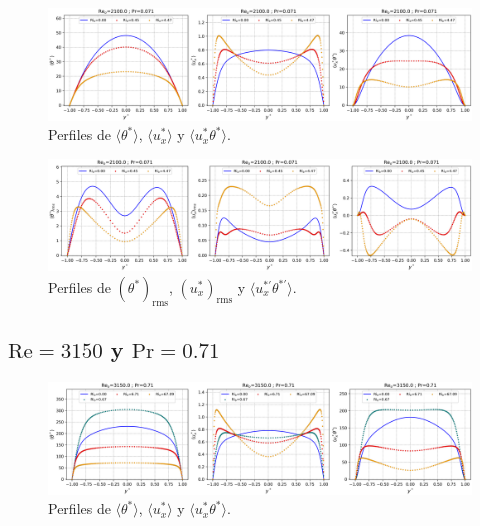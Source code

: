 \begin{figure}[H]
  \centering
    \includegraphics[width=\textwidth]{figures/apendices/developed/Re2100-Pr0071_merged_phi-ux-uxphi.png}
  \caption{Perfiles de  $\langle \theta^* \rangle$,  $\langle u^*_x \rangle$ y   $\langle u^*_x \theta^* \rangle$.}
  \label{fig:profs-Re2100-Pr0071}
\end{figure}

\begin{figure}[H]
  \centering
    \includegraphics[width=\textwidth]{figures/apendices/developed/Re2100-Pr0071_merged_phif-uxf-uxphif.png}
  \caption{Perfiles de  $( \theta^*)_{\text{rms}}$,  $(u^*_x)_{\text{rms}}$ y   $\langle u^{* \prime}_x \theta^{* \prime} \rangle$.}
  \label{fig:profs-Re2100-Pr0071}
\end{figure}


\subsection*{$\text{Re}=3150$ y $\text{Pr}=0\text{.}71$}

\begin{figure}[H]
  \centering
    \includegraphics[width=\textwidth]{figures/apendices/developed/Re3150-Pr071_merged_phi-ux-uxphi.png}
  \caption{Perfiles de  $\langle \theta^* \rangle$,  $\langle u^*_x \rangle$ y   $\langle u^*_x \theta^* \rangle$.}
  \label{fig:profs-Re2100-Pr071}
\end{figure}

